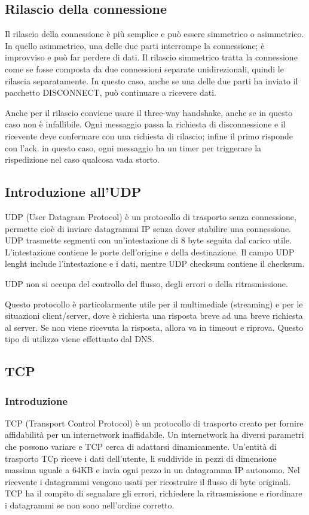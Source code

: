 \subsection{Rilascio della connessione}
Il rilascio della connessione è più semplice e può essere simmetrico o asimmetrico.
In quello asimmetrico, una delle due parti interrompe la connessione; è improvviso e può far perdere di dati.
Il rilascio simmetrico tratta la connessione come se fosse composta da due connessioni separate unidirezionali, quindi le rilascia separatamente.
In questo caso, anche se una delle due parti ha inviato il pacchetto DISCONNECT, può continuare a ricevere dati.

Anche per il rilascio conviene usare il three-way handshake, anche se in questo caso non è infallibile.
Ogni messaggio passa la richiesta di disconnessione e il ricevente deve confermare con una richiesta di rilascio; infine il primo risponde con l'ack.
in questo caso, ogni messaggio ha un timer per triggerare la rispedizione nel caso qualcosa vada storto.

\subsection{Introduzione all'UDP}
UDP (User Datagram Protocol) è un protocollo di trasporto senza connessione, permette cioè di inviare datagrammi IP senza dover stabilire una connessione.
UDP trasmette segmenti con un'intestazione di 8 byte seguita dal carico utile.
L'intestazione contiene le porte dell'origine e della destinazione.
Il campo UDP lenght include l'intestazione e i dati, mentre UDP checksum contiene il checksum.

UDP non si occupa del controllo del flusso, degli errori o della ritrasmissione.

Questo protocollo è particolarmente utile per il multimediale (streaming) e per le situazioni client/server,
dove è richiesta una risposta breve ad una breve richiesta al server.
Se non viene ricevuta la risposta, allora va in timeout e riprova.
Questo tipo di utilizzo viene effettuato dal DNS.

\subsection{TCP}

\subsubsection{Introduzione}
TCP (Transport Control Protocol) è un protocollo di trasporto creato per fornire affidabilità per un internetwork inaffidabile.
Un internetwork ha diversi parametri che possono variare e TCP cerca di adattarsi dinamicamente.
Un'entità di trasporto TCp riceve i dati dell'utente, li suddivide in pezzi di dimensione massima uguale a 64KB e invia ogni pezzo in un datagramma 
IP autonomo.
Nel ricevente i datagrammi vengono usati per ricostruire il flusso di byte originali. 
TCP ha il compito di segnalare gli errori, richiedere la ritrasmissione e riordinare i datagrammi se non sono nell'ordine corretto.

